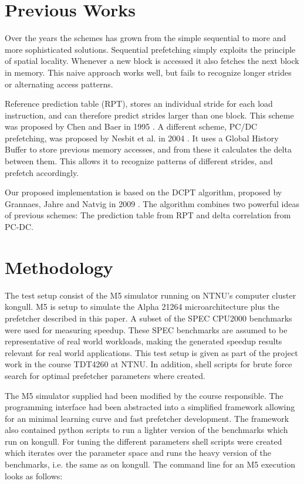 \documentclass[12pt,journal,compsoc]{IEEEtran}
\begin{document}
\section{Previous Works}
Over the years the schemes has grown from the simple sequential to more and
more sophisticated solutions. Sequential prefetching simply exploits the
principle of spatial locality. Whenever a new block is accessed it also
fetches the next block in memory. This naive approach works well, but fails
to recognize longer strides or alternating access patterns.

Reference prediction table (RPT), stores an individual stride for each load
instruction, and can therefore predict strides larger than one block. This
scheme was proposed by Chen and Baer in 1995 \cite{rptpaper}. A different scheme,
PC/DC prefetching, was proposed by Nesbit et al. in 2004 \cite{pcdcpaper}. It
uses a Global History Buffer to store previous memory accesses, and from these
it calculates the delta between them. This allows it to recognize patterns of
different strides, and prefetch accordingly.

Our proposed implementation is based on the DCPT algorithm, proposed by
Grannaes, Jahre and Natvig in 2009 \cite{dcptpaper}. The algorithm combines two
powerful ideas of previous schemes: The prediction table from RPT and delta
correlation from PC-DC.

\section{Methodology}
The test setup consist of the M5 simulator running on NTNU's computer
cluster kongull. M5 is setup to simulate the Alpha 21264 microarchitecture
plus the prefetcher described in this paper. A subset of the SPEC CPU2000
benchmarks were used for measuring speedup. These SPEC benchmarks are assumed
to be representative of real world workloads, making the generated speedup
results relevant for real world applications. This test setup is given
as part of the project work in the course TDT4260 at NTNU. In addition,
shell scripts for brute force search for optimal prefetcher parameters
where created.

The M5 simulator supplied had been modified by the course responsible. The
programming interface had been abstracted into a simplified framework
allowing for an minimal learning curve and fast prefetcher development. The
framework also contained python scripts to run a lighter version of the
benchmarks which run on kongull. For tuning the different parameters shell
scripts were created which iterates over the parameter space and runs the
heavy version of the benchmarks, i.e. the same as on kongull. The command line
for an M5 execution looks as follows:
\end{document}
